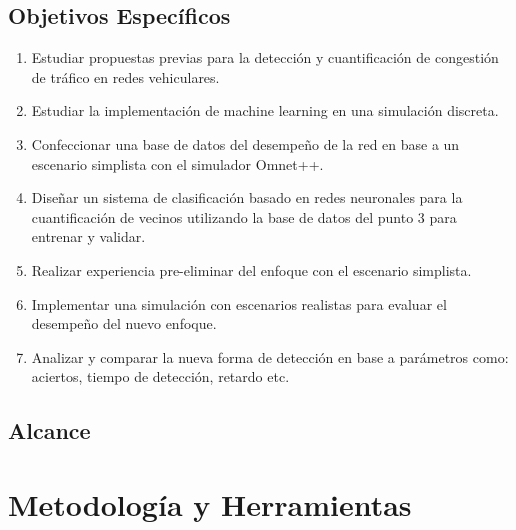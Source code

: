 \subsection{Objetivos Específicos}
\begin{enumerate}
    \item Estudiar propuestas previas para la detección y cuantificación de congestión de tráfico en redes vehiculares.
    \item Estudiar la implementación de machine learning en una simulación discreta.
    \item Confeccionar una base de datos del desempeño de la red en base a un escenario simplista con el simulador Omnet++.
    \item Diseñar un sistema de clasificación basado en redes neuronales para la cuantificación de vecinos utilizando la base de datos del punto 3 para entrenar y validar.
    \item Realizar experiencia pre-eliminar del enfoque con el escenario simplista.
    \item Implementar una simulación con escenarios realistas para evaluar el desempeño del nuevo enfoque.
    \item Analizar y comparar la nueva forma de detección en base a parámetros como: aciertos, tiempo de detección, retardo etc.
\end{enumerate}

\subsection{Alcance}

\section{Metodología y Herramientas}


